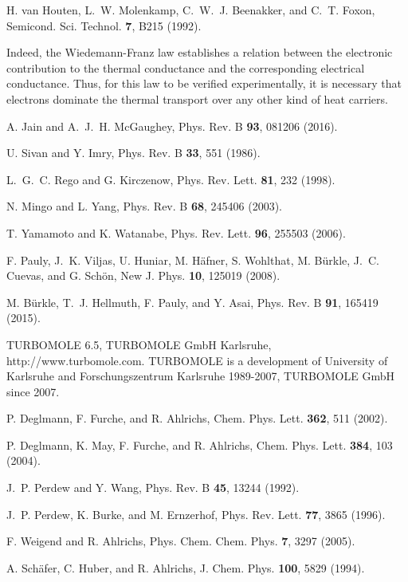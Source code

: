 \documentclass[aps,amsmath,amssymb,twocolumn,showpacs]{revtex4-1}
\begin{document}
\begin{thebibliography}{00}
H. van Houten, L.~W. Molenkamp, C.~W.~J. Beenakker, and C.~T. Foxon, 
Semicond. Sci. Technol. {\bf 7}, B215 (1992).

Indeed, the Wiedemann-Franz law establishes a relation between
the electronic contribution to the thermal conductance and the corresponding
electrical conductance. Thus, for this law to be verified experimentally, it
is necessary that electrons dominate the thermal transport over any other
kind of heat carriers.

A. Jain and A.~J.~H. McGaughey, 
Phys. Rev. B {\bf 93}, 081206 (2016).

U. Sivan and Y. Imry, Phys. Rev. B {\bf 33}, 551 (1986).

L.~G.~C. Rego and G. Kirczenow, 
Phys. Rev. Lett. {\bf 81}, 232 (1998).

N. Mingo and L. Yang, 
Phys. Rev. B {\bf 68}, 245406 (2003).

T. Yamamoto and K. Watanabe, 
Phys. Rev. Lett. {\bf 96}, 255503 (2006).

F. Pauly, J.~K. Viljas, U. Huniar, M. H\"afner, S. Wohlthat, M. B\"urkle, J.~C. Cuevas, 
and G. Sch\"on, 
New J. Phys. {\bf 10}, 125019 (2008).

M. B\"urkle, T.~J. Hellmuth, F. Pauly, and Y. Asai,
Phys. Rev. B {\bf 91}, 165419 (2015).

TURBOMOLE 6.5, TURBOMOLE GmbH Karlsruhe, http://www.turbomole.com. TURBOMOLE
is a development of University of Karlsruhe and Forschungszentrum Karlsruhe 1989-2007, 
TURBOMOLE GmbH since 2007.

P. Deglmann, F. Furche, and R. Ahlrichs, 
Chem. Phys. Lett. {\bf 362}, 511 (2002).

P. Deglmann, K. May, F. Furche, and R. Ahlrichs, 
Chem. Phys. Lett. {\bf 384}, 103 (2004).

J.~P. Perdew and Y. Wang, Phys. Rev. B {\bf 45}, 13244 (1992).

J.~P. Perdew, K. Burke, and M. Ernzerhof, 
Phys. Rev. Lett. {\bf 77}, 3865 (1996).

F. Weigend and R. Ahlrichs, Phys. Chem. Chem. Phys. {\bf 7}, 3297 (2005).

A. Sch\"afer, C. Huber, and R. Ahlrichs,
J. Chem. Phys. {\bf 100}, 5829 (1994).


\end{thebibliography}
\end{document}
